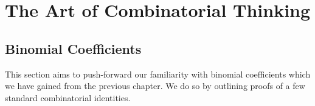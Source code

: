 \chapter{The Art of Combinatorial Thinking}
\section{Binomial Coefficients}
This section aims to push-forward our familiarity with binomial coefficients which we have gained from the previous chapter. We do so by outlining proofs of a few standard combinatorial identities.


